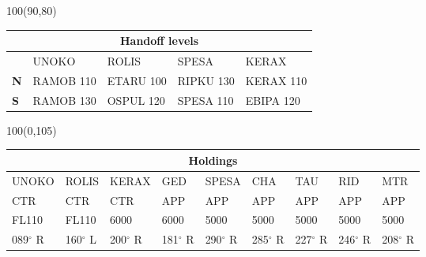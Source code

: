 \documentclass[10pt,landscape,a4paper]{article}
\begin{document}
\begin{textblock}{100}(90,80)
\begin{table}[]
\begin{tabular}{|l|l|l|l|l|}
\multicolumn{5}{c}{\textbf{Handoff levels}}              \\ \hline
           & UNOKO     & ROLIS     & SPESA     & KERAX     \\ \hline
\textbf{N} & RAMOB 110 & ETARU 100 & RIPKU 130 & KERAX 110 \\
\textbf{S} & RAMOB 130 & OSPUL 120 & SPESA 110 & EBIPA 120 \\ \hline
\end{tabular}
\end{table}
\end{textblock}

\begin{textblock}{100}(0,105)
\begin{table}[]
\begin{tabular}{|l|l|l|l|l|l|l|l|l|}

\multicolumn{9}{c}{\textbf{Holdings}}                                        \\ \hline
UNOKO  & ROLIS  & KERAX  & GED    & SPESA  & CHA    & TAU    & RID    & MTR    \\ \hline
CTR    & CTR    & CTR    & APP    & APP    & APP    & APP    & APP    & APP    \\
FL110  & FL110  & 6000   & 6000   & 5000   & 5000   & 5000   & 5000   & 5000   \\
089$^\circ$ R & 160$^\circ$ L & 200$^\circ$ R & 181$^\circ$ R & 290$^\circ$ R & 285$^\circ$ R & 227$^\circ$ R & 246$^\circ$ R & 208$^\circ$ R \\ \hline
\end{tabular}
\end{table}
\end{textblock}
\end{document}
